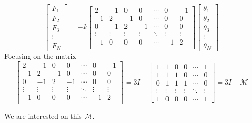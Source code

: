 \documentclass[letter, 10pts]{article}
\begin{document}
\[
\begin{bmatrix} F_1 \\ F_2 \\ F_3 \\ \vdots \\ F_N \end{bmatrix}  = 
- k 
\begin{bmatrix}
	2 & -1 & 0 & 0 & \cdots & 0 & -1 \\ 
	-1 & 2 & -1 & 0 & \cdots & 0 & 0 \\ 
	0 & -1 & 2 & -1 & \cdots & 0 & 0 \\ 
	\vdots & 
	\vdots & 
	\vdots & 
	\vdots & 
	\ddots & 
	\vdots & 
	\vdots \\ 
	-1& 0 & 0 & 0 & \cdots & -1 & 2 \\ 
\end{bmatrix} 
\begin{bmatrix} \theta_1 \\ \theta_2 \\ \theta_3 \\ \vdots \\ \theta_N \end{bmatrix} 
\] 
Focusing on the matrix 
\[
\begin{bmatrix}
	2 & -1 & 0 & 0 & \cdots & 0 & -1 \\ 
	-1 & 2 & -1 & 0 & \cdots & 0 & 0 \\ 
	0 & -1 & 2 & -1 & \cdots & 0 & 0 \\ 
	\vdots & 
	\vdots & 
	\vdots & 
	\vdots & 
	\ddots & 
	\vdots & 
	\vdots \\ 
	-1& 0 & 0 & 0 & \cdots & -1 & 2 \\ 
\end{bmatrix}  
= 3 I - 
\begin{bmatrix} 1 & 1 & 0 & 0 & \cdots & 1 \\ 
1 & 1 & 1 & 0 & \cdots & 0 \\ 
0 & 1 & 1 & 1 & \cdots & 0 \\ 
	\vdots & 
	\vdots & 
	\vdots & 
	\vdots & 
	\ddots & 
	\vdots \\ 
	1 & 0 & 0 & 0 &  \cdots & 1  
\end{bmatrix}  = 3 I - \mathcal M 
\] 

We are interested on this $\mathcal M$.
\end{document}
